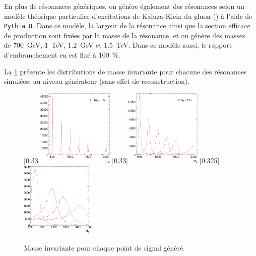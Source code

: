En plus de résonances \zprime génériques, on génère également des résonances selon un modèle théorique particulier d'excitations de Kaluza-Klein du gluon (\kkg) \citep{Agashe:2006hk,Randall:1999vf} à l'aide de \texttt{Pythia 8}. Dans ce modèle, la largeur de la résonance ainsi que la section efficace de production sont fixées par la masse de la résonance, et on génère des masses de \SI{700}{\GeV}, \SI{1}{\TeV}, \SI{1.2}{\GeV} et \SI{1.5}{\TeV}. Dans ce modèle aussi, le rapport d'embranchement en \ttbar est fixé à \SI{100}{\percent}.

\medskip

La \cref{fig:mtt_gen} présente les distributions de masse invariante \ttbar pour chacune des résonances simulées, au niveau générateur (sans effet de reconstruction).

\begin{figure}[tbp] \centering
    [0.33\textwidth]{\includegraphics[width=0.33\textwidth]{chapitre7/figs/mtt_zprime_narrow_gen.pdf}} \hfill
    [0.33\textwidth]{\includegraphics[width=0.33\textwidth]{chapitre7/figs/mtt_zprime_large_gen.pdf}} \hfill
    \subcaptionbox{\kkglu}[0.325\textwidth]{\includegraphics[width=0.325\textwidth]{chapitre7/figs/mtt_rsgluons_gen.pdf}}
    \caption{Masse invariante \ttbar pour chaque point de signal généré.}
    \label{fig:mtt_gen}
\end{figure}

